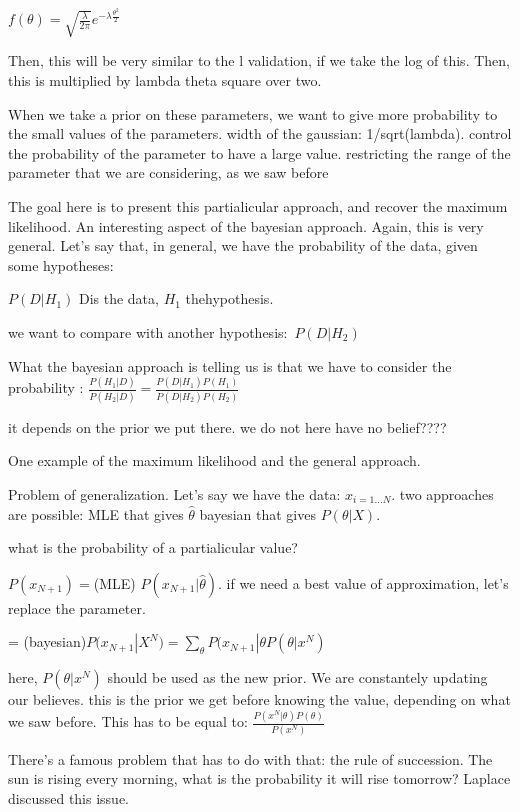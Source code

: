 \documentclass[a4paper]{tufte-book}
\begin{document}
$f(\theta)  = \sqrt{\frac{\lambda}{2\pi}} e^{-\lambda \frac{\theta^2}{2}}$

Then, this will be very similar to the l validation, if we take the log of this.
Then, this is multiplied by lambda theta square over two.

When we take a prior on these parameters, we want to give more probability to
the small values of the parameters. width of the gaussian: 1/sqrt(lambda).
control the probability of the parameter to have a large value.
restricting the range of the parameter that we are considering, as we saw before

The goal here is to present this partialicular approach, and recover the maximum
likelihood.
An interesting aspect of the bayesian approach. Again, this is very general.
Let's say that, in general, we have the probability of the data, given some
hypotheses:

$P(D|H_1)$
Dis the data, $H_1$ thehypothesis.

we want to compare with another hypothesis: $P(D|H_2)$

What the bayesian approach is telling us is that we have to consider the
probability :
$\frac{P(H_1|D)}{P(H_2|D)} = \frac{P(D|H_1)P(H_1)}{P(D|H_2)P(H_2)}$

it depends on the prior we put there. we do not here have no belief????

One example of the maximum likelihood and the general approach.

Problem of generalization.
Let's say we have the data:
$x_{i=1\ldots N}$. two approaches are possible:
MLE that gives $\hat\theta$
bayesian that gives $P(\theta|X)$.

what is the probability of a partialicular value?

$P(x_{N+1}) = $(MLE) $P(x_{N+1}|\hat\theta)$. if we need a best value of approximation, let's replace the parameter.

= (bayesian)$ P(x_{N+1} | X^N) = \sum_\theta P(x_{N+1}|\theta P(\theta |x^N)$

here, $P(\theta |x^N)$ should be used as the new prior. We are constantely updating our believes. this is the prior we get before knowing the
value,
depending on what we saw before. This has to be equal to:
$\frac{P(x^N|\theta)P(\theta)}{P(x^N)}$

There's a famous problem that has to do with that: the rule of succession.
The sun is rising every morning, what is the probability it will rise tomorrow?
Laplace discussed this issue.
\end{document}
